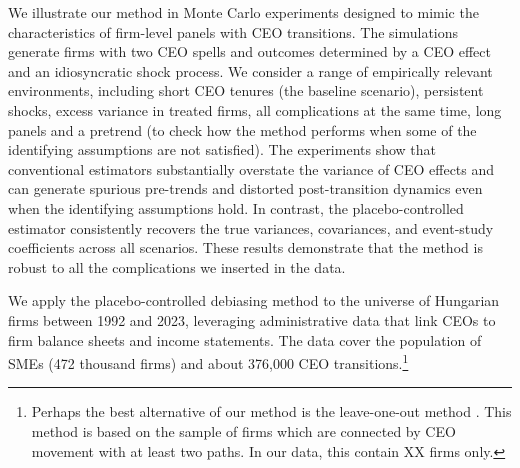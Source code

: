 \documentclass[11pt,a4paper]{article}
\begin{document}
We illustrate our method in Monte Carlo experiments designed to mimic the characteristics of firm-level panels with CEO transitions. The simulations generate firms with two CEO spells and outcomes determined by a CEO effect and an idiosyncratic shock process. We consider a range of empirically relevant environments, including short CEO tenures (the baseline scenario), persistent shocks, excess variance in treated firms, all complications at the same time, long panels and a pretrend (to check how the method performs when some of the identifying assumptions are not satisfied). The experiments show that conventional estimators substantially overstate the variance of CEO effects and can generate spurious pre-trends and distorted post-transition dynamics even when the identifying assumptions hold. In contrast, the placebo-controlled estimator consistently recovers the true variances, covariances, and event-study coefficients across all scenarios. These results demonstrate that the method is robust to all the complications we inserted in the data.

We apply the placebo-controlled debiasing method to the universe of Hungarian firms between 1992 and 2023, leveraging administrative data that link CEOs to firm balance sheets and income statements. The data cover the population of SMEs (472 thousand firms) and about 376,000 CEO transitions.\footnote{Perhaps the best alternative of our method is the leave-one-out method \citep{kline2020leave}. This method is based on the sample of firms which are connected by CEO movement with at least two paths. In our data, this contain XX firms only.}

\end{document}
